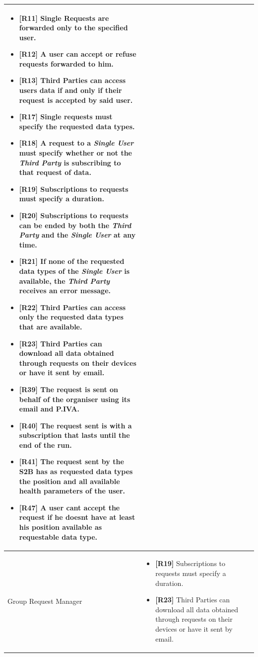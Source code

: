 \documentclass[titlepage]{article}
\begin{document}
\begin{longtable}{| p{5 cm} | p{8 cm} |}
\begin{itemize}
			\item {\bf [R11]} Single Requests are forwarded only to the specified user.
			\item {\bf [R12]} A user can accept or refuse requests forwarded to him. 
			\item {\bf [R13]} Third Parties can access user\textsc{\char13}s data if and only if their request is accepted by said user. 
			\item {\bf [R17]} Single requests must specify the requested data types. 
			\item {\bf [R18]} A request to a {\it Single User} must specify whether or not the {\it Third Party} is subscribing to that request of data.
			\item {\bf [R19]} Subscriptions to requests must specify a duration.
			\item {\bf [R20]} Subscriptions to requests can be ended by both the {\it Third Party} and the {\it Single User} at any time.
			\item {\bf [R21]} If none of the requested data types of the {\it Single User} is available, the {\it Third Party} receives an error message.
			\item {\bf [R22]} Third Parties can access only the requested data types that are available.
			\item {\bf [R23]} Third Parties can download all data obtained through requests on their devices or have it sent by email.
			\item {\bf [R39]} The request is sent on behalf of the organiser using its email and P.IVA.
			\item {\bf [R40]} The request sent is with a subscription that lasts until the end of the run.
			\item {\bf [R41]} The request sent by the S2B has as requested data types the position and all available health parameters of the user.
			\item {\bf [R47]} A user can\textsc{\char13}t accept the request if he doesn\textsc{\char13}t have at least his position available as requestable data type.
		\end{itemize}		
		\\	 \hline	
		\newline Group Request Manager & 
		\begin{itemize}
			\item {\bf [R19]} Subscriptions to requests must specify a duration.
			\item {\bf [R23]} Third Parties can download all data obtained through requests on their devices or have it sent by email.

\end{itemize}
\end{longtable}
\end{document}
